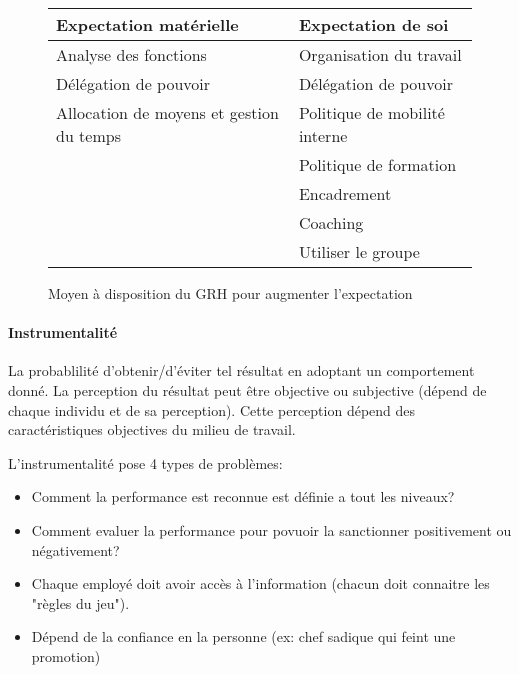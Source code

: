 \documentclass[11pt]{article} %
\begin{document}
		\begin{figure}[H]
		\centering
		\begin{tabular}{|l|l|}
			\hline
			\textbf{Expectation matérielle} & \textbf{Expectation de soi} \\
			\hline
			Analyse des fonctions & Organisation du travail\\
			Délégation de pouvoir & Délégation de pouvoir \\
			Allocation de moyens et gestion du temps & Politique de mobilité interne\\
			& Politique de formation\\
			& Encadrement\\
			& Coaching\\
			& Utiliser le groupe\\
			\hline
		\end{tabular}
		\caption{Moyen à disposition du GRH pour augmenter l'expectation}
		\end{figure}
		 
		 \paragraph{Instrumentalité} La probablilité d'obtenir/d'éviter tel résultat en adoptant un
		 comportement donné. La perception du résultat peut être objective ou subjective (dépend de chaque 
		 individu et de sa perception). Cette perception dépend des caractéristiques objectives du milieu de 
		 travail.
		
		L'instrumentalité pose 4 types de problèmes:
		 \begin{itemize}
		 	\item Comment la performance est reconnue est définie a tout les niveaux? 
		 	\item Comment evaluer la performance pour povuoir la sanctionner positivement ou négativement?
		 	\item Chaque employé doit avoir accès à l'information (chacun doit connaitre les "règles du jeu").
		 	\item Dépend de la confiance en la personne (ex: chef sadique qui feint une promotion)
		 \end{itemize}
		 
\end{document}
